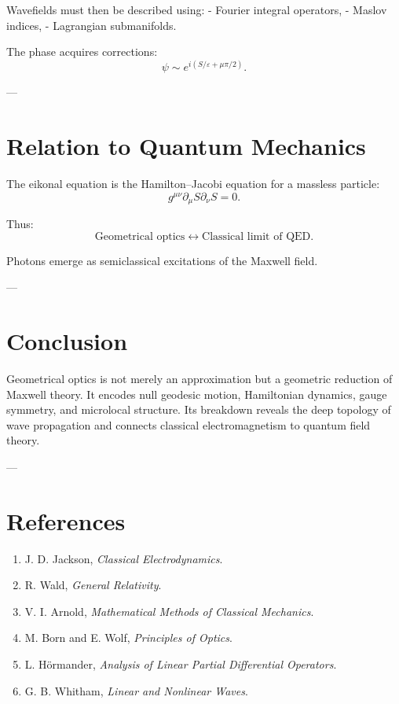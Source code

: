 \documentclass[12pt]{article}
\begin{document}
Wavefields must then be described using:
- Fourier integral operators,
- Maslov indices,
- Lagrangian submanifolds.

The phase acquires corrections:
\[
\psi \sim e^{i(S/\varepsilon + \mu \pi/2)}.
\]

---

\section{Relation to Quantum Mechanics}

The eikonal equation is the Hamilton–Jacobi equation for a massless particle:
\[
g^{\mu\nu} \partial_\mu S \partial_\nu S = 0.
\]

Thus:
\[
\text{Geometrical optics} \leftrightarrow \text{Classical limit of QED}.
\]

Photons emerge as semiclassical excitations of the Maxwell field.

---

\section{Conclusion}

Geometrical optics is not merely an approximation but a geometric reduction of Maxwell theory. It encodes null geodesic motion, Hamiltonian dynamics, gauge symmetry, and microlocal structure. Its breakdown reveals the deep topology of wave propagation and connects classical electromagnetism to quantum field theory.

---

\section*{References}

\begin{enumerate}
\item J. D. Jackson, \textit{Classical Electrodynamics}.
\item R. Wald, \textit{General Relativity}.
\item V. I. Arnold, \textit{Mathematical Methods of Classical Mechanics}.
\item M. Born and E. Wolf, \textit{Principles of Optics}.
\item L. Hörmander, \textit{Analysis of Linear Partial Differential Operators}.
\item G. B. Whitham, \textit{Linear and Nonlinear Waves}.
\end{enumerate}
\end{document}
